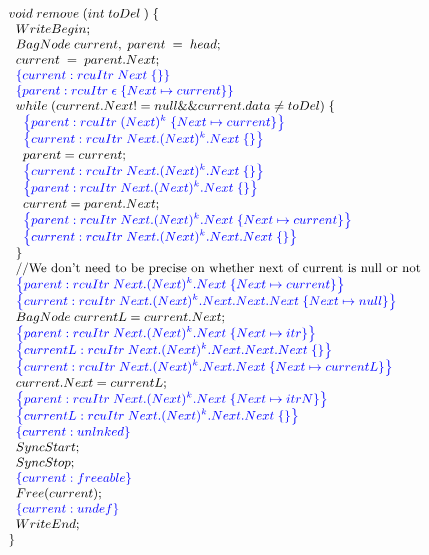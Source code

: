 \[\small
\begin{array}{@{}l@{}}
   void\; remove\;(int \;toDel\;)\;\{\\
   \;\;WriteBegin;\\
   \;\;BagNode\; current,\;parent\;=\;head;\\
   \;\;current\;=\; parent.Next;\\
   \;\;\specline{current:rcuItr\; Next \; \{\}}\\
   \;\;\specline{parent:rcuItr\; \epsilon\; \{Next \mapsto current\}}\\
   \;\;while\;(current.Next != null \&\& current.data \neq toDel)\;\{\\
   \;\;\;\;\specline{parent:rcuItr\; (Next)^{k} \; \{Next \mapsto current \}}\\
   \;\;\;\;\specline{current:rcuItr\; Next.(Next)^{k}.Next \; \{ \}}\\
   \;\;\;\;parent= current;\\
   \;\;\;\;\specline{current:rcuItr\; Next.(Next)^{k}.Next \; \{ \}}\\
   \;\;\;\;\specline{parent:rcuItr\; Next.(Next)^{k}.Next \; \{ \}}\\
   \;\;\;\;current = parent.Next;\\
   \;\;\;\;\specline{parent:rcuItr\; Next.(Next)^{k}.Next \; \{Next \mapsto current \}}\\
   \;\;\;\;\specline{current:rcuItr\; Next.(Next)^{k}.Next.Next \; \{ \}}\\
   \;\;\}\\
   \;\;\text{//We don't need to be precise on whether next of current is null or not} \\
   \;\;\specline{parent:rcuItr\; Next.(Next)^{k}.Next \; \{Next \mapsto current \}}\\
   \;\;\specline{current:rcuItr\; Next.(Next)^{k}.Next.Next.Next \; \{Next \mapsto null \} }\\
   \;\;BagNode \;currentL= current.Next;\\
   \;\;\specline{parent:rcuItr\; Next.(Next)^{k}.Next \; \{Next \mapsto itr \}}\\
   \;\;\specline{currentL:rcuItr\; Next.(Next)^{k}.Next.Next.Next \; \{\} }\\
   \;\;\specline{current:rcuItr \; Next.(Next)^{k}.Next.Next \;\{Next \mapsto currentL\} }\\
   \;\;current.Next=currentL;\\
   \;\;\specline{parent:rcuItr\; Next.(Next)^{k}.Next \; \{Next \mapsto itrN \}}\\
   \;\;\specline{currentL:rcuItr\; Next.(Next)^{k}.Next.Next \; \{\} }\\
   \;\;\specline{current:unlnked }\\
   \;\;SyncStart;\\
   \;\;SyncStop;\\
   \;\;\specline{current:freeable}\\
   \;\;Free(current);\\
   \;\;\specline{current:undef}\\
   \;\;WriteEnd;\\
   \}\\
   \end{array}
\]
